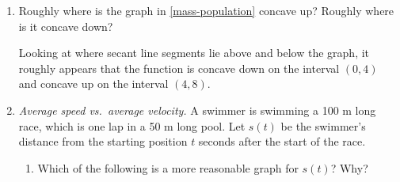 \documentclass{article}
\begin{document}
\begin{enumerate}
\item 


  \begin{problem}[\nstretch{0.25}]
    Roughly where is the graph in \ref{mass-population} concave up? Roughly where is it concave down?
  \end{problem}

  \begin{solution}
    Looking at where secant line segments lie above and below the graph, it roughly appears that the
    function is concave down on the interval $(0,4)$ and concave up on the interval $(4,8)$.
  \end{solution}

\item  \label{swim-race} 

  \emph{Average speed vs.\ average velocity.} A swimmer is swimming a 100 m long race, which is one lap in a 50 m long pool. Let $s(t)$ be the swimmer's distance from the starting position $t$ seconds after the start of the race.

  \begin{enumerate}
  \item


    \begin{problem}[0.25in]
      Which of the following is a more reasonable graph for $s(t)$?  Why? 


\end{problem}
\end{enumerate}
\end{enumerate}
\end{document}
